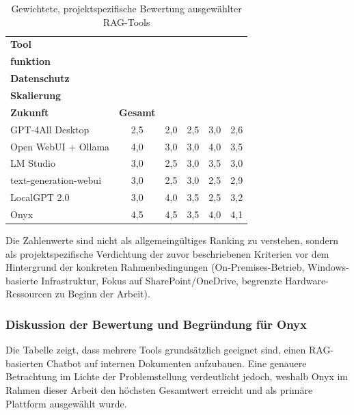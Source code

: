 \begin{table}[htbp]
    \centering
    \small
    \begin{tabular}{lccccc}
        \toprule
        \textbf{Tool} &
        \makecell{\textbf{Kern-}\\\textbf{funktion}} &
        \makecell{\textbf{Betrieb/}\\\textbf{Datenschutz}} &
        \makecell{\textbf{Ressourcen/}\\\textbf{Skalierung}} &
        \makecell{\textbf{Usability/}\\\textbf{Zukunft}} &
        \textbf{Gesamt} \\
        \midrule
        GPT-4All Desktop        & 2{,}5 & 2{,}0 & 2{,}5 & 3{,}0 & 2{,}6 \\
        Open WebUI + Ollama     & 4{,}0 & 3{,}0 & 3{,}0 & 4{,}0 & 3{,}5 \\
        LM Studio               & 3{,}0 & 2{,}5 & 3{,}0 & 3{,}5 & 3{,}0 \\
        text-generation-webui   & 3{,}0 & 2{,}5 & 3{,}0 & 2{,}5 & 2{,}9 \\
        LocalGPT 2.0            & 3{,}0 & 4{,}0 & 3{,}5 & 2{,}5 & 3{,}2 \\
        Onyx                    & 4{,}5 & 4{,}5 & 3{,}5 & 4{,}0 & 4{,}1 \\
        \bottomrule
    \end{tabular}
    \caption{Gewichtete, projektspezifische Bewertung ausgewählter RAG-Tools}
    \label{tab:rag-tools-gewichtung}
\end{table}
\vspace{1cm}
\FloatBarrier

Die Zahlenwerte sind nicht als allgemeingültiges Ranking zu verstehen, sondern als projektspezifische Verdichtung der zuvor beschriebenen Kriterien vor dem Hintergrund der konkreten Rahmenbedingungen (On-Premises-Betrieb, Windows-basierte Infrastruktur, Fokus auf SharePoint/OneDrive, begrenzte Hardware-Ressourcen zu Beginn der Arbeit).

\subsubsection{Diskussion der Bewertung und Begründung für Onyx}

Die Tabelle zeigt, dass mehrere Tools grundsätzlich geeignet sind, einen RAG-basierten Chatbot auf internen Dokumenten aufzubauen.
Eine genauere Betrachtung im Lichte der Problemstellung verdeutlicht jedoch, weshalb Onyx im Rahmen dieser Arbeit den höchsten Gesamtwert erreicht und als primäre Plattform ausgewählt wurde.

